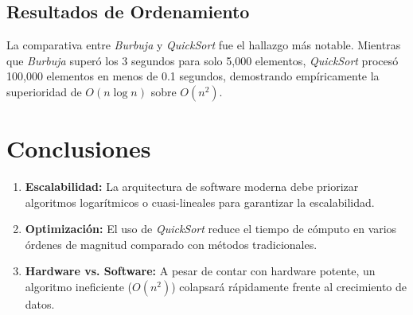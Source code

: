 \documentclass[12pt,a4paper]{article}
\begin{document}
\subsection{Resultados de Ordenamiento}
La comparativa entre \textit{Burbuja} y \textit{QuickSort} fue el hallazgo más notable. Mientras que \textit{Burbuja} superó los 3 segundos para solo 5,000 elementos, \textit{QuickSort} procesó 100,000 elementos en menos de 0.1 segundos, demostrando empíricamente la superioridad de $O(n \log n)$ sobre $O(n^2)$.

\section{Conclusiones}
\begin{enumerate}
    \item \textbf{Escalabilidad:} La arquitectura de software moderna debe priorizar algoritmos logarítmicos o cuasi-lineales para garantizar la escalabilidad.
    \item \textbf{Optimización:} El uso de \textit{QuickSort} reduce el tiempo de cómputo en varios órdenes de magnitud comparado con métodos tradicionales.
    \item \textbf{Hardware vs. Software:} A pesar de contar con hardware potente, un algoritmo ineficiente ($O(n^2)$) colapsará rápidamente frente al crecimiento de datos.
\end{enumerate}
\end{document}
